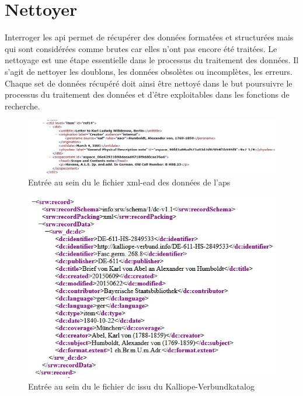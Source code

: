 \documentclass[a4paper, 12pt, twoside]{book}
\begin{document}
\section{Nettoyer}
Interroger les \gls{api} permet de récupérer des données formatées et structurées mais qui sont considérées comme brutes car elles n'ont pas encore été traitées. Le nettoyage est une étape essentielle dans le processus du traitement des données. Il s'agit de nettoyer les doublons, les données obsolètes ou incomplètes, les erreurs. Chaque set de données récupéré doit ainsi être nettoyé dans le but poursuivre le processus du traitement des données et d'être exploitables dans les fonctions de recherche.

\begin{figure}[h!]
    \centering
    \caption{Entrée au sein du le fichier \gls{xml}-\gls{ead} des données de l'\gls{aps}}
    \includegraphics[scale=0.5]{img/APS-item.jpg}
    \hfill
\end{figure}

\begin{figure}[h!]
    \centering
    \caption{Entrée au sein du le fichier \gls{dc} issu du Kalliope-Verbundkatalog}
    \includegraphics[scale=0.6]{img/kalliope-item.jpg}
    \hfill
\end{figure}
\end{document}
